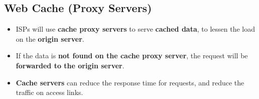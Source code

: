 \documentclass[16pt]{article}
\begin{document}
    \subsection*{Web Cache (Proxy Servers)}
    \begin{itemize}
        \item ISPs will use \textbf{cache proxy servers} to serve \textbf{cached data}, to lessen the load on the \textbf{origin server}.
        \item If the data is \textbf{not found on the cache proxy server}, the request will be \textbf{forwarded to the origin server}.
        \item \textbf{Cache servers} can reduce the response time for requests, and reduce the traffic on access links.
    \end{itemize}
\end{document}
